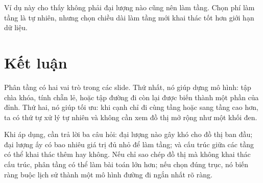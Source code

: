 \documentclass[11pt]{article}
\begin{document}
Ví dụ này cho thấy không phải đại lượng nào cũng nên làm tầng. Chọn phí làm
tầng là tự nhiên, nhưng chọn chiều dài làm tầng mới khai thác tốt hơn giới
hạn dữ liệu.

\section{Kết luận}

Phân tầng có hai vai trò trong các slide. Thứ nhất, nó giúp dựng mô hình:
tập chìa khóa, tính chẵn lẻ, hoặc tập đường đi còn lại được biến thành một
phần của đỉnh. Thứ hai, nó giúp tối ưu: khi cạnh chỉ đi cùng tầng hoặc sang
tầng cao hơn, ta có thứ tự xử lý tự nhiên và không cần xem đồ thị mở rộng như
một khối đen.

Khi áp dụng, cần trả lời ba câu hỏi: đại lượng nào gây khó cho đồ thị ban
đầu; đại lượng ấy có bao nhiêu giá trị đủ nhỏ để làm tầng; và cấu trúc giữa
các tầng có thể khai thác thêm hay không. Nếu chỉ sao chép đồ thị mà không
khai thác cấu trúc, phân tầng có thể làm bài toán lớn hơn; nếu chọn đúng
trục, nó biến ràng buộc lịch sử thành một mô hình đường đi ngắn nhất rõ ràng.
\end{document}
